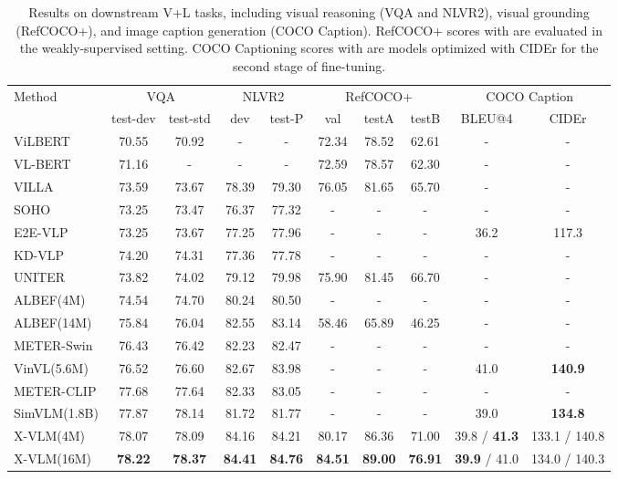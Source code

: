 \documentclass[nohyperref]{article}
\theoremstyle{plain}
\theoremstyle{definition}
\theoremstyle{remark}
\begin{document}
\begin{table*}[!t]
	\caption
	{
		Results on downstream V+L tasks, including visual reasoning (VQA and NLVR2), visual grounding (RefCOCO+), and image caption generation (COCO Caption). RefCOCO+ scores with  are evaluated in the weakly-supervised setting. COCO Captioning scores with  are models optimized with CIDEr for the second stage of fine-tuning. 
 	}
	\label{tbl:results}
    \small
	\centering	
\begin{tabular}	{l   |  c  c  c  c  c c c c c}
	\toprule
	 \multirow{2}{*}{Method} & \multicolumn{2}{c}{VQA} & \multicolumn{2}{c}{NLVR2} & \multicolumn{3}{c}{RefCOCO+} & \multicolumn{2}{c}{COCO Caption} \\
	  & test-dev & test-std & dev & test-P & val & testA & testB & BLEU@4 & CIDEr \\
	  \midrule
	  ViLBERT & 70.55 & 70.92 & - & - & 72.34 & 78.52 & 62.61 & - & - \\
	  VL-BERT & 71.16 & - &  - & - & 72.59 & 78.57 & 62.30 & - & - \\
	   VILLA & 73.59 & 73.67 & 78.39 & 79.30 & 76.05 & 81.65 & 65.70 & - & - \\
	  SOHO & 73.25 & 73.47 & 76.37 & 77.32 & - & - & - & - & - \\
	   E2E-VLP & 73.25 & 73.67 & 77.25 & 77.96 & - & - & - & 36.2 & 117.3 \\
	   	KD-VLP & 74.20 & 74.31 & 77.36 & 77.78 & - & - & - & - & - \\
  	  UNITER & 73.82 & 74.02 & 79.12 & 79.98 & 75.90 & 81.45 & 66.70 & - & - \\
     ALBEF(4M) & 74.54 & 74.70 & 80.24 & 80.50 & - & - & - & - & - \\
   	  ALBEF(14M) & 75.84 & 76.04 & 82.55 & 83.14 & 58.46 & 65.89 & 46.25 & - & -\\
   	       METER-Swin & 76.43 & 76.42 & 82.23 & 82.47 & - & - & - & - & - \\
      	   VinVL(5.6M) & 76.52 & 76.60 & 82.67 & 83.98 & - & - & - & 41.0 & \textbf{140.9} \\
   	      METER-CLIP & 77.68 & 77.64 & 82.33 & 83.05 & - & - & - & - & - \\
   	     SimVLM(1.8B) &  77.87 & 78.14 & 81.72 & 81.77 & - & - & - & 39.0 & \textbf{134.8} \\
	  \midrule
	  X-VLM(4M) & 78.07 & 78.09 & 84.16 & 84.21 & 80.17 & 86.36 & 71.00 & 39.8 / \textbf{41.3} & 133.1 / 140.8 \\
	  X-VLM(16M) & \textbf{78.22} & \textbf{78.37} & \textbf{84.41} & \textbf{84.76} & \textbf{84.51} & \textbf{89.00} & \textbf{76.91} & \textbf{39.9} / 41.0 & 134.0 / 140.3 \\
  	  	\bottomrule
  	  
	\end{tabular}
\end{table*}
\end{document}

